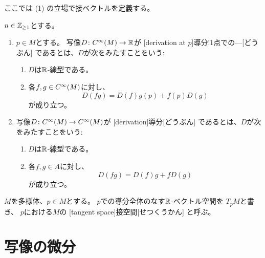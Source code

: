 \documentclass[report]{jlreq}
\begin{document}
ここでは (1) の立場で接ベクトルを定義する。

\begin{definition}[導分]
    $n \in \mathbb{Z}_{\ge 1}$とする。
    \begin{enumerate}
        \item $p \in M$とする。
            写像$D \colon C^\infty(M) \to \mathbb{R}$が
            [derivation at $p$]{導分!1点での---}[どうぶん]
            であるとは、$D$が次をみたすことをいう:
            \begin{enumerate}
                \item $D$は$\mathbb{R}$-線型である。
                \item 各$f, g \in C^\infty(M)$に対し、
                    \begin{equation}
                        D(fg) = D(f)g(p) + f(p)D(g)
                    \end{equation}
                    が成り立つ。
            \end{enumerate}
        \item 写像$D \colon C^\infty(M) \to C^\infty(M)$が
            [derivation]{導分}[どうぶん]
            であるとは、$D$が次をみたすことをいう:
            \begin{enumerate}
                \item $D$は$\mathbb{R}$-線型である。
                \item 各$f, g \in A$に対し、
                    \begin{equation}
                        D(fg) = D(f)g + fD(g)
                    \end{equation}
                    が成り立つ。
            \end{enumerate}
    \end{enumerate}
\end{definition}

\begin{definition}[多様体の接空間]
    $M$を多様体、$p \in M$とする。
    $p$での導分全体のなす$\mathbb{R}$-ベクトル空間を
    $T_pM$と書き、
    $p$における$M$の
    [tangent space]{接空間}[せつくうかん]
    と呼ぶ。
\end{definition}


%
\section{写像の微分}
\end{document}
